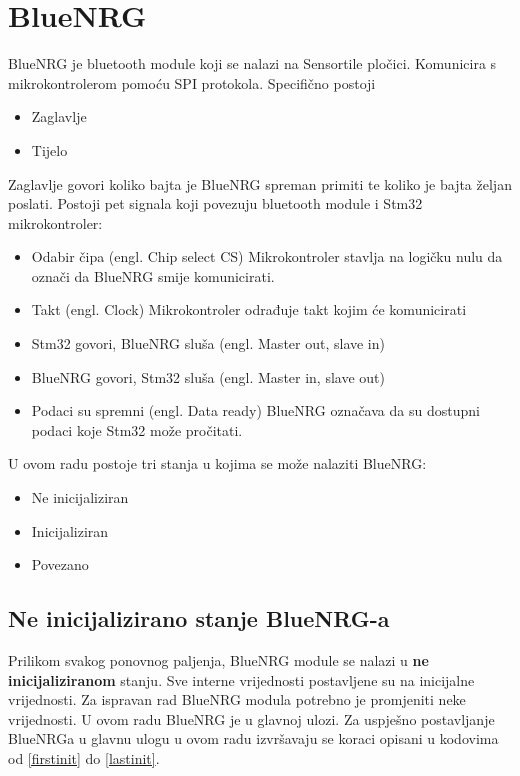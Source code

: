 \documentclass[times, utf8, diplomski]{diplomski}
\begin{document}
\section{BlueNRG}
BlueNRG je bluetooth module koji se nalazi na Sensortile pločici. Komunicira s mikrokontrolerom pomoću SPI protokola.
Specifično postoji

\begin{itemize}
  \item Zaglavlje
  \item Tijelo
\end{itemize}

Zaglavlje govori koliko bajta je BlueNRG spreman primiti te koliko je bajta željan poslati.
Postoji pet signala koji povezuju bluetooth module i Stm32 mikrokontroler:

\begin{itemize}
  \item Odabir čipa (engl. Chip select CS) Mikrokontroler stavlja na logičku nulu da označi da BlueNRG smije komunicirati.
  \item Takt (engl. Clock) Mikrokontroler odrađuje takt kojim će komunicirati
  \item Stm32 govori, BlueNRG sluša (engl. Master out, slave in)
  \item BlueNRG govori, Stm32 sluša (engl. Master in, slave out)
  \item Podaci su spremni (engl. Data ready) BlueNRG označava da su dostupni podaci koje Stm32 može pročitati.
\end{itemize}

U ovom radu postoje tri stanja u kojima se može nalaziti BlueNRG:

\begin{itemize}
  \item Ne inicijaliziran
  \item Inicijaliziran
  \item Povezano
\end{itemize}

\subsection{Ne inicijalizirano stanje BlueNRG-a}
Prilikom svakog ponovnog paljenja, BlueNRG module se nalazi u \textbf{ne inicijaliziranom} stanju. Sve interne vrijednosti postavljene su na inicijalne vrijednosti. Za ispravan rad BlueNRG modula potrebno je promjeniti neke vrijednosti. U ovom radu BlueNRG je u glavnoj ulozi. Za uspješno postavljanje BlueNRGa u glavnu ulogu u ovom radu izvršavaju se koraci opisani u kodovima od \ref{firstinit} do \ref{lastinit}.
\end{document}

